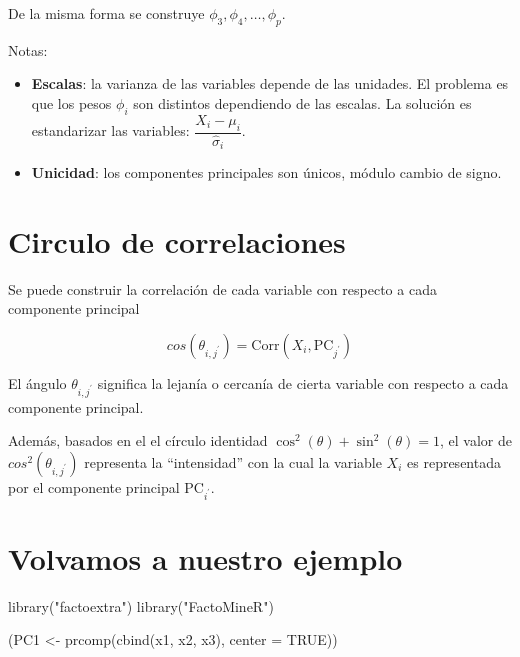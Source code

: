 \documentclass[
  12pt,
]{book}
\newenvironment{Shaded}{\begin{snugshade}}{\end{snugshade}}
\newcommand{\AttributeTok}[1]{\textcolor[rgb]{0.77,0.63,0.00}{#1}}
\newcommand{\ConstantTok}[1]{\textcolor[rgb]{0.00,0.00,0.00}{#1}}
\newcommand{\FunctionTok}[1]{\textcolor[rgb]{0.00,0.00,0.00}{#1}}
\newcommand{\NormalTok}[1]{#1}
\newcommand{\OtherTok}[1]{\textcolor[rgb]{0.56,0.35,0.01}{#1}}
\newcommand{\StringTok}[1]{\textcolor[rgb]{0.31,0.60,0.02}{#1}}
\providecommand{\tightlist}{%
  \setlength{\itemsep}{0pt}\setlength{\parskip}{0pt}}
\theoremstyle{definition}
\theoremstyle{definition}
\theoremstyle{definition}
\theoremstyle{definition}
\theoremstyle{remark}
\begin{document}
De la misma forma se construye \(\phi_3,\phi_4,\dots, \phi_p\).

Notas:

\begin{itemize}
\tightlist
\item
  \textbf{Escalas}: la varianza de las variables depende de las unidades. El problema es que los pesos \(\phi_i\) son distintos dependiendo de las escalas. La solución es estandarizar las variables: \(\dfrac{X_i-\mu_i}{\hat\sigma_i}\).
\item
  \textbf{Unicidad}: los componentes principales son únicos, módulo cambio de signo.
\end{itemize}

\hypertarget{circulo-de-correlaciones}{%
\section{Circulo de correlaciones}\label{circulo-de-correlaciones}}

Se puede construir la correlación de cada variable con respecto a cada componente principal

\[
cos(\theta_{i,j^\prime}) = \mathrm{Corr}(X_i, \mathrm{PC}_{j^\prime})
\]

El ángulo \(\theta_{i,j^\prime}\) significa la lejanía o cercanía de cierta variable con respecto a cada componente principal.

Además, basados en el el círculo identidad \(\cos^2(\theta)+\sin^2(\theta)=1\), el valor de \(cos^2(\theta_{i,j^\prime})\) representa la ``intensidad'' con la cual la variable \(X_i\) es representada por el componente principal \(\mathrm{PC}_{i^\prime}\).

\hypertarget{volvamos-a-nuestro-ejemplo}{%
\section{Volvamos a nuestro ejemplo}\label{volvamos-a-nuestro-ejemplo}}

\begin{Shaded}
\begin{Highlighting}[]
\FunctionTok{library}\NormalTok{(}\StringTok{"factoextra"}\NormalTok{)}
\FunctionTok{library}\NormalTok{(}\StringTok{"FactoMineR"}\NormalTok{)}
\end{Highlighting}
\end{Shaded}

\begin{Shaded}
\begin{Highlighting}[]
\NormalTok{(PC1 }\OtherTok{\textless{}{-}} \FunctionTok{prcomp}\NormalTok{(}\FunctionTok{cbind}\NormalTok{(x1, x2, x3), }\AttributeTok{center =} \ConstantTok{TRUE}\NormalTok{))}
\end{Highlighting}
\end{Shaded}
\end{document}
